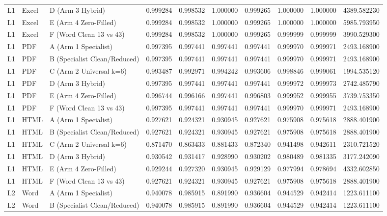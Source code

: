 \begin{tabular}{lllrrrrrrr}
L1 & Excel & D (Arm 3 Hybrid) & 0.999284 & 0.998532 & 1.000000 & 0.999265 & 1.000000 & 1.000000 & 4389.582230 \\
L1 & Excel & E (Arm 4 Zero-Filled) & 0.999284 & 0.998532 & 1.000000 & 0.999265 & 1.000000 & 1.000000 & 5985.793950 \\
L1 & Excel & F (Word Clean 13 vs 43) & 0.999284 & 0.998532 & 1.000000 & 0.999265 & 0.999999 & 0.999999 & 3990.529300 \\
L1 & PDF & A (Arm 1 Specialist) & 0.997395 & 0.997441 & 0.997441 & 0.997441 & 0.999970 & 0.999971 & 2493.168900 \\
L1 & PDF & B (Specialist Clean/Reduced) & 0.997395 & 0.997441 & 0.997441 & 0.997441 & 0.999970 & 0.999971 & 2493.168900 \\
L1 & PDF & C (Arm 2 Universal k=6) & 0.993487 & 0.992971 & 0.994242 & 0.993606 & 0.998846 & 0.999061 & 1994.535120 \\
L1 & PDF & D (Arm 3 Hybrid) & 0.997395 & 0.997441 & 0.997441 & 0.997441 & 0.999972 & 0.999973 & 2742.485790 \\
L1 & PDF & E (Arm 4 Zero-Filled) & 0.996744 & 0.996166 & 0.997441 & 0.996803 & 0.999952 & 0.999955 & 3739.753350 \\
L1 & PDF & F (Word Clean 13 vs 43) & 0.997395 & 0.997441 & 0.997441 & 0.997441 & 0.999970 & 0.999971 & 2493.168900 \\
L1 & HTML & A (Arm 1 Specialist) & 0.927621 & 0.924321 & 0.930945 & 0.927621 & 0.975908 & 0.975618 & 2888.401900 \\
L1 & HTML & B (Specialist Clean/Reduced) & 0.927621 & 0.924321 & 0.930945 & 0.927621 & 0.975908 & 0.975618 & 2888.401900 \\
L1 & HTML & C (Arm 2 Universal k=6) & 0.871470 & 0.863433 & 0.881433 & 0.872340 & 0.941498 & 0.942611 & 2310.721520 \\
L1 & HTML & D (Arm 3 Hybrid) & 0.930542 & 0.931417 & 0.928990 & 0.930202 & 0.980489 & 0.981335 & 3177.242090 \\
L1 & HTML & E (Arm 4 Zero-Filled) & 0.929244 & 0.927320 & 0.930945 & 0.929129 & 0.977994 & 0.978694 & 4332.602850 \\
L1 & HTML & F (Word Clean 13 vs 43) & 0.927621 & 0.924321 & 0.930945 & 0.927621 & 0.975908 & 0.975618 & 2888.401900 \\
L2 & Word & A (Arm 1 Specialist) & 0.940078 & 0.985915 & 0.891990 & 0.936604 & 0.944529 & 0.942414 & 1223.611100 \\
L2 & Word & B (Specialist Clean/Reduced) & 0.940078 & 0.985915 & 0.891990 & 0.936604 & 0.944529 & 0.942414 & 1223.611100 \\

\end{tabular}

